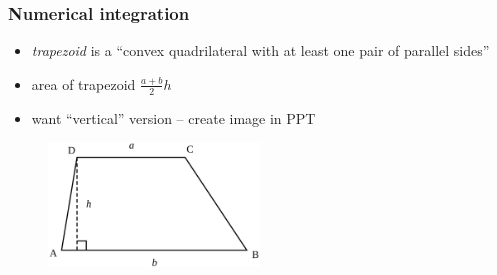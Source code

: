 \documentclass[english,14pt]{beamer}
\newcommand\red[1]{{\color{red} #1}}
\newcommand\blue[1]{{\color{blue} #1}}
\newcommand\darkGreen[1]{{\color{darkGreen} #1}}
\begin{document}
\begin{frame}[fragile]

\frametitle{Numerical integration}

\begin{itemize}
	\item \red{\emph{trapezoid}} is a ``convex quadrilateral with at least one pair of parallel sides''
	\item area of trapezoid $\frac{a+b}{2} h$
	\item want ``vertical'' version -- create image in PPT
	
\end{itemize}

\begin{figure}[ht]
	\centering
	\includegraphics[width=0.5\textwidth]{figures/Trapezoid}
\end{figure}


%

\end{frame}

\end{document}
